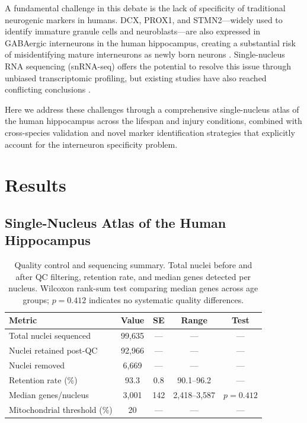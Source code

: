 \documentclass[11pt]{article}
\begin{document}
A fundamental challenge in this debate is the lack of specificity of traditional neurogenic markers in humans. DCX, PROX1, and STMN2---widely used to identify immature granule cells and neuroblasts---are also expressed in GABAergic interneurons in the human hippocampus, creating a substantial risk of misidentifying mature interneurons as newly born neurons \citep{kempermann2018human}. Single-nucleus RNA sequencing (snRNA-seq) offers the potential to resolve this issue through unbiased transcriptomic profiling, but existing studies have also reached conflicting conclusions \citep{franjic2022transcriptomic}.

Here we address these challenges through a comprehensive single-nucleus atlas of the human hippocampus across the lifespan and injury conditions, combined with cross-species validation and novel marker identification strategies that explicitly account for the interneuron specificity problem.

\section{Results}

\subsection{Single-Nucleus Atlas of the Human Hippocampus}

\begin{table}[H]
\centering
\caption{Quality control and sequencing summary. Total nuclei before and after QC filtering, retention rate, and median genes detected per nucleus. Wilcoxon rank-sum test comparing median genes across age groups; $p = 0.412$ indicates no systematic quality differences.}
\label{tab:qc}
\begin{tabular}{lcccc}
\toprule
Metric & Value & SE & Range & Test \\
\midrule
Total nuclei sequenced & 99,635 & --- & --- & --- \\
Nuclei retained post-QC & 92,966 & --- & --- & --- \\
Nuclei removed & 6,669 & --- & --- & --- \\
Retention rate (\%) & 93.3 & 0.8 & 90.1--96.2 & --- \\
Median genes/nucleus & 3,001 & 142 & 2,418--3,587 & $p = 0.412$ \\
Mitochondrial threshold (\%) & 20 & --- & --- & --- \\
\bottomrule
\end{tabular}
\end{table}
\end{document}
